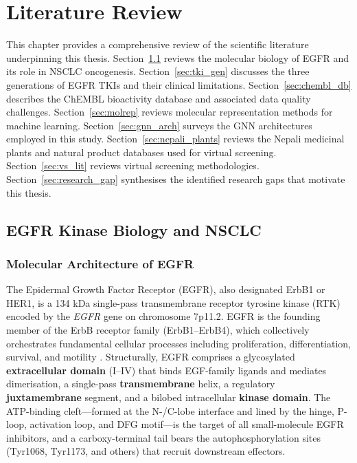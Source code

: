\chapter{Literature Review}
\label{chap:lit_review}

This chapter provides a comprehensive review of the scientific literature
underpinning this thesis. Section~\ref{sec:egfr_bio} reviews the molecular
biology of EGFR and its role in NSCLC oncogenesis. Section~\ref{sec:tki_gen}
discusses the three generations of EGFR TKIs and their clinical limitations.
Section~\ref{sec:chembl_db} describes the ChEMBL bioactivity database and
associated data quality challenges. Section~\ref{sec:molrep} reviews molecular
representation methods for machine learning. Section~\ref{sec:gnn_arch} surveys the GNN architectures employed in this study.
Section~\ref{sec:nepali_plants} reviews the Nepali medicinal plants and natural
product databases used for virtual screening.
Section~\ref{sec:vs_lit} reviews virtual screening methodologies.
Section~\ref{sec:research_gap} synthesises the identified research gaps
that motivate this thesis.

\section{EGFR Kinase Biology and NSCLC}
\label{sec:egfr_bio}

\subsection{Molecular Architecture of EGFR}

The Epidermal Growth Factor Receptor (EGFR), also designated ErbB1 or HER1,
is a 134 kDa single-pass transmembrane receptor tyrosine kinase (RTK) encoded
by the \textit{EGFR} gene on chromosome 7p11.2. EGFR is the founding member of
the ErbB receptor family (ErbB1--ErbB4), which collectively orchestrates
fundamental cellular processes including proliferation, differentiation, survival,
and motility \parencite{hynes2005erbb}. Structurally, EGFR comprises a glycosylated \textbf{extracellular domain} (I--IV)
that binds EGF-family ligands and mediates dimerisation, a single-pass
\textbf{transmembrane} helix, a regulatory \textbf{juxtamembrane} segment, and a
bilobed intracellular \textbf{kinase domain}. The ATP-binding cleft---formed at the
N-/C-lobe interface and lined by the hinge, P-loop, activation loop, and DFG
motif---is the target of all small-molecule EGFR inhibitors, and a carboxy-terminal
tail bears the autophosphorylation sites (Tyr1068, Tyr1173, and others) that recruit
downstream effectors.

